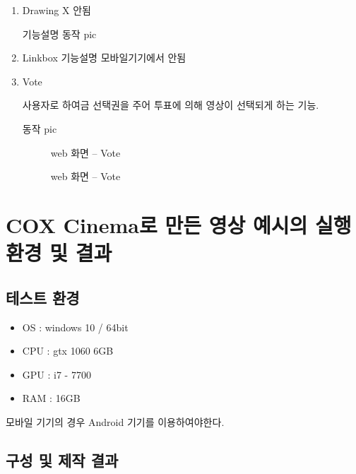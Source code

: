 \documentclass{oblivoir}
\newcommand{\spec}{
\begin{itemize}
    \item OS : windows 10 / 64bit
    \item CPU : gtx 1060 6GB
    \item GPU : i7 - 7700
    \item RAM : 16GB
\end{itemize}
}
\begin{document}
\begin{enumerate}
    \item Drawing X 안됨

    기능설명
    동작 pic


    \item Linkbox
    기능설명 모바일기기에서 안됨

    \item Vote

    사용자로 하여금 선택권을 주어 투표에 의해 영상이 선택되게 하는 기능.

    동작 pic

    \begin{figure}[h!]
    \centering
    \caption{web 화면 – Vote}
    \end{figure} 


    \begin{figure}[h!]
    \centering
    \caption{web 화면 – Vote}
    \end{figure} 

\end{enumerate}

\section{ COX Cinema로 만든 영상 예시의 실행환경 및 결과 }

\subsection{테스트 환경 }
\spec
모바일 기기의 경우 Android 기기를 이용하여야한다.

\subsection{ 구성 및 제작 결과}
\end{document}
